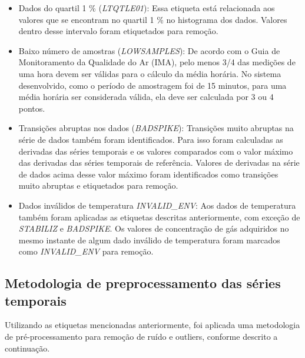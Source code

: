 \begin{itemize}
    \item Dados do quartil 1 \% (\textit{LTQTLE01}): Essa etiqueta está relacionada aos valores que se encontram no quartil 1 \% no histograma dos dados. Valores dentro desse intervalo foram etiquetados para remoção.
    \item Baixo número de amostras (\textit{LOWSAMPLES}): De acordo com o Guia de Monitoramento da Qualidade do Ar (IMA), pelo menos 3/4 das medições de uma hora devem ser válidas para o cálculo da média horária. No sistema desenvolvido, como o período de amostragem foi de 15 minutos, para uma média horária ser considerada válida, ela deve ser calculada por 3 ou 4 pontos.
    \item Transições abruptas nos dados (\textit{BADSPIKE}): Transições muito abruptas na série de dados também foram identificados. Para isso foram calculadas as derivadas das séries temporais e os valores comparados com o valor máximo das derivadas das séries temporais de referência. Valores de derivadas na série de dados acima desse valor máximo foram identificados como transições muito abruptas e etiquetados para remoção.
    \item Dados inválidos de temperatura \textit{INVALID\_ENV}: Aos dados de temperatura também foram aplicadas as etiquetas descritas anteriormente, com exceção de \textit{STABILIZ} e \textit{BADSPIKE}. Os valores de concentração de gás adquiridos no mesmo instante de algum dado inválido de temperatura foram marcados como \textit{INVALID\_ENV} para remoção.    
\end{itemize}

\subsection{Metodologia de preprocessamento das séries temporais}

Utilizando as etiquetas mencionadas anteriormente, foi aplicada uma metodologia de pré-processamento para remoção de ruído e outliers, conforme descrito a continuação.

